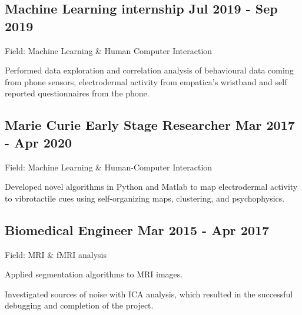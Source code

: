 \documentclass[a4paper,12pt]{article}
\begin{document}
\subsection{Machine Learning internship \hfill Jul 2019 - Sep 2019}
\vspace*{1pt}
Field: Machine Learning \& Human Computer Interaction \\
\vspace*{\spaceAfterField}
\begin{zitemize}
\item Performed data exploration and correlation analysis of behavioural data coming from phone sensors, electrodermal activity from empatica's wristband and self reported questionnaires from the phone.
\end{zitemize}
\vspace*{5pt}


\subsection{Marie Curie Early Stage Researcher \hfill Mar 2017 - Apr 2020}
\vspace*{1pt}
Field: Machine Learning \& Human-Computer Interaction
\vspace*{\spaceAfterField}
\begin{zitemize}
\item Developed novel algorithms in Python and Matlab to map electrodermal activity to vibrotactile cues using self-organizing maps, clustering, and psychophysics.
\end{zitemize}
\vspace*{5pt}



\subsection{Biomedical Engineer \hfill Mar 2015 - Apr 2017}
\vspace*{1pt}
Field: MRI \& fMRI analysis
\vspace*{\spaceAfterField}
\begin{zitemize}
\item Applied segmentation algorithms to MRI images.
\item Investigated sources of noise with ICA analysis, which resulted in the successful debugging and completion of the project.
\end{zitemize}
\end{document}
